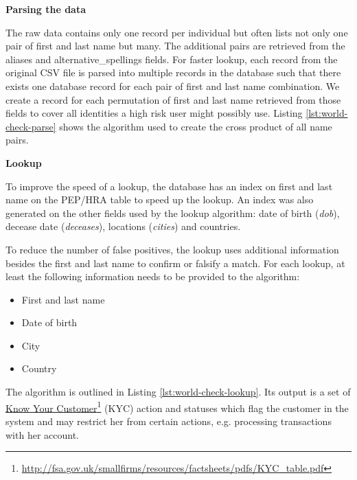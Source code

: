 \documentclass[a4paper, oneside]{csthesis}
\newcommand\fnurl[2]{%
  \href{#2}{#1}\footnote{\url{#2}}%
}
\begin{document}
\textbf{Parsing the data}

The raw data contains only one record per individual but often lists not only one pair of first and last name but many. The additional pairs are retrieved from the aliases and alternative\_spellings fields. For faster lookup, each record from the original CSV file is parsed into multiple records in the database such that there exists one database record for each pair of first and last name combination. We create a record for each permutation of first and last name retrieved from those fields to cover all identities a high risk user might possibly use.
Listing \ref{lst:world-check-parse} shows the algorithm used to create the cross product of all name pairs.

\textbf{Lookup}

To improve the speed of a lookup, the database has an index on first and last name on the PEP/HRA table to speed up the lookup. An index was also generated on the other fields used by the lookup algorithm: date of birth (\emph{dob}), decease date (\emph{deceases}), locations (\emph{cities}) and countries.

To reduce the number of false positives, the lookup uses additional information besides the first and last name to confirm or falsify a match. For each lookup, at least the following information needs to be provided to the algorithm:
\begin{itemize}
\item First and last name
\item Date of birth
\item City
\item Country
\end{itemize}

The algorithm is outlined in Listing \ref{lst:world-check-lookup}. Its output is a set of \fnurl{Know Your Customer}{http://fsa.gov.uk/smallfirms/resources/factsheets/pdfs/KYC_table.pdf} (KYC) action and statuses which flag the customer in the system and may restrict her from certain actions, e.g. processing transactions with her account.
\end{document}
